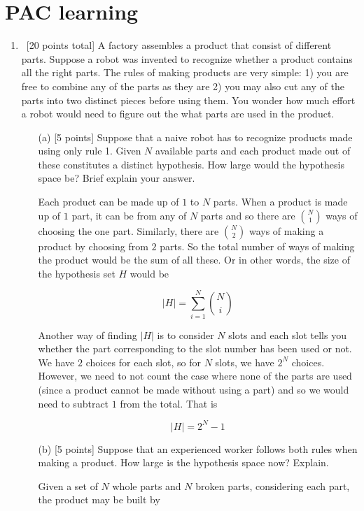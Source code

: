 \section{PAC learning}
\label{sec:pac-learning}
\begin{enumerate}

\item ~[20 points total] A factory assembles a product that consist of
  different parts. Suppose a robot was invented to recognize whether a
  product contains all the right parts. The rules of making products
  are very simple: 1) you are free to combine any of the parts as they
  are 2) you may also cut any of the parts into two distinct pieces
  before using them. You wonder how much effort a robot would need to
  figure out the what parts are used in the product.

\begin{itemize}
\item[(a)] [5 points] Suppose that a naive robot has to recognize
  products made using only rule 1. Given $N$ available parts and each
  product made out of these constitutes a distinct hypothesis. How
  large would the hypothesis space be? Brief explain your answer.
    
Each product can be made up of $1$ to $N$ parts. When a product is made up of $1$ part, it can be from any of $N$ parts and so there are ${N \choose 1}$ ways of choosing the one part. Similarly, there are ${N \choose 2}$ ways of making a product by choosing from $2$ parts. So the total number of ways of making the product would be the sum of all these. Or in other words, the size of the hypothesis set $H$ would be

$$
\left | H \right | = \sum_{i=1}^N {N \choose i}
$$

Another way of finding $\left|H\right|$ is to consider $N$ slots and each slot tells you whether the part corresponding to the slot number has been used or not. We have $2$ choices for each slot, so for $N$ slots, we have $2^N$ choices. However, we need to not count the case where none of the parts are used (since a product cannot be made without using a part) and so we would need to subtract $1$ from the total. That is

$$
\left | H \right | = 2^N - 1
$$

\item[(b)] [5 points] Suppose that an experienced worker follows both
  rules when making a product. How large is the hypothesis space now?
  Explain.

Given a set of $N$ whole parts and $N$ broken parts, considering each part, the product may be built by 


\end{itemize}
\end{enumerate}
